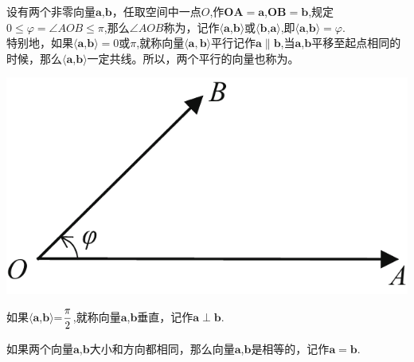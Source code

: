 \vspace*{0.5em}

\noindent
\begin{minipage}{0.55\linewidth}
\hspace*{2em} 设有两个非零向量$\boldsymbol{a}$,$\boldsymbol{b}$，任取空间中一点$O$,作$\boldsymbol{OA}=\boldsymbol{a}$,$\boldsymbol{OB}=\boldsymbol{b}$,规定$0\leq \varphi=\angle AOB\leq \pi$,那么$\angle AOB$称为，记作$\langle\boldsymbol{a}$,$\boldsymbol{b}\rangle$或$\langle\boldsymbol{b}$,$\boldsymbol{a}\rangle$,即$\langle\boldsymbol{a}$,$\boldsymbol{b}\rangle=\varphi$.\\
\hspace*{2em} 特别地，如果$\langle\boldsymbol{a}$,$\boldsymbol{b}\rangle=0$或$\pi$,就称向量$\langle\boldsymbol{a},\boldsymbol{b}
\rangle$平行记作$\boldsymbol{a}\parallel\boldsymbol{b}$,当$\boldsymbol{a}$,$\boldsymbol{b}$平移至起点相同的时候，那么$\langle\boldsymbol{a}$,$\boldsymbol{b}\rangle$一定共线。所以，两个平行的向量也称为。
\end{minipage}
\begin{minipage}{0.45\linewidth}
	\centering
	\includegraphics[width = 0.65\linewidth]{pic/C-5/vecang}
	\vspace*{-1em}
	\label{向量的夹角}
\end{minipage}
\vspace*{0.1em}

\noindent \hspace*{2em}如果$\langle\boldsymbol{a}$,$\boldsymbol{b}\rangle$=$\displaystyle\frac{\pi}{2}$,就称向量$\boldsymbol{a}$,$\boldsymbol{b}$垂直，记作$\boldsymbol{a}\perp\boldsymbol{b}$.

如果两个向量$\boldsymbol{a}$,$\boldsymbol{b}$大小和方向都相同，那么向量$\boldsymbol{a}$,$\boldsymbol{b}$是相等的，记作$\boldsymbol{a}=\boldsymbol{b}$.

